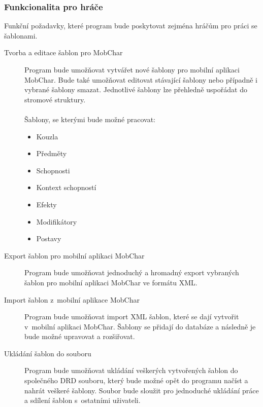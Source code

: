 \documentclass[thesis=B,czech]{resources/FITthesis}[2012/06/26]
\begin{document}
\subsubsection{Funkcionalita pro hráče}
Funkční požadavky, které program bude poskytovat zejména hráčům pro práci se šablonami.
\begin{description}

\item[Tvorba a editace šablon pro MobChar] Program bude umožňovat vytvářet nové šablony pro mobilní aplikaci MobChar. Bude také umožňovat editovat stávající šablony nebo případně i vybrané šablony smazat. Jednotlivé šablony lze přehledně uspořádat do stromové struktury.\\
\\
Šablony, se kterými bude možné pracovat:
				\begin{itemize}
					\item Kouzla
					\item Předměty
					\item Schopnosti
					\item Kontext schopností
					\item Efekty
					\item Modifikátory
					\item Postavy
				\end{itemize}		
\item[Export šablon pro mobilní aplikaci MobChar] Program bude umožňovat jednoduchý a hromadný export vybraných šablon pro mobilní aplikaci MobChar ve formátu XML.

\item[Import šablon z~mobilní aplikace MobChar] Program bude umožňovat import XML šablon, které se dají vytvořit v~mobilní aplikaci MobChar. Šablony se přidají do databáze a následně je bude možné upravovat a rozšiřovat.

\item[Ukládání šablon do souboru] Program bude umožňovat ukládání veškerých vytvořených šablon do společného DRD souboru, který bude možné opět do programu načíst a nahrát veškeré šablony. Soubor bude sloužit pro jednoduché ukládání práce a sdílení šablon s~ostatními uživateli. 
\end{description}
\end{document}
